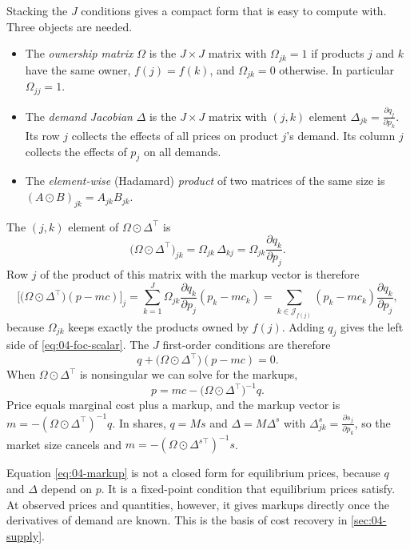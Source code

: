 Stacking the $J$ conditions gives a compact form that is easy to compute with. Three objects are needed.
\begin{itemize}
  \item The \emph{ownership matrix} $\Omega$ is the $J \times J$ matrix with $\Omega_{jk} = 1$ if products $j$ and
  $k$ have the same owner, $f(j) = f(k)$, and $\Omega_{jk} = 0$ otherwise. In particular $\Omega_{jj} = 1$.
  \item The \emph{demand Jacobian} $\Delta$ is the $J \times J$ matrix with $(j, k)$ element
  $\Delta_{jk} = \frac{\partial q_j}{\partial p_k}$. Its row $j$ collects the effects of all prices on product
  $j$'s demand. Its column $j$ collects the effects of $p_j$ on all demands.
  \item The \emph{element-wise} (Hadamard) \emph{product} of two matrices of the same size is
  $(A \odot B)_{jk} = A_{jk}B_{jk}$.
\end{itemize}
The $(j, k)$ element of $\Omega \odot \Delta^\top$ is
\begin{equation*}
\big(\Omega \odot \Delta^\top\big)_{jk} = \Omega_{jk}\,\Delta_{kj} = \Omega_{jk}\frac{\partial q_k}{\partial p_j}.
\end{equation*}
Row $j$ of the product of this matrix with the markup vector is therefore
\begin{equation*}
\Big[\big(\Omega \odot \Delta^\top\big)(p - mc)\Big]_j
= \sum_{k = 1}^{J}\Omega_{jk}\frac{\partial q_k}{\partial p_j}(p_k - mc_k)
= \sum_{k \in \mathcal{J}_{f(j)}}(p_k - mc_k)\frac{\partial q_k}{\partial p_j},
\end{equation*}
because $\Omega_{jk}$ keeps exactly the products owned by $f(j)$. Adding $q_j$ gives the left side of
\eqref{eq:04-foc-scalar}. The $J$ first-order conditions are therefore
\begin{equation}\label{eq:04-foc-matrix}
q + \big(\Omega \odot \Delta^\top\big)(p - mc) = 0.
\end{equation}
When $\Omega \odot \Delta^\top$ is nonsingular we can solve for the markups,
\begin{equation}\label{eq:04-markup}
p = mc - \big(\Omega \odot \Delta^\top\big)^{-1}q.
\end{equation}
Price equals marginal cost plus a markup, and the markup vector is $m = -(\Omega \odot \Delta^\top)^{-1}q$. In
shares, $q = Ms$ and $\Delta = M\Delta^s$ with $\Delta^s_{jk} = \frac{\partial s_j}{\partial p_k}$, so the market
size cancels and $m = -(\Omega \odot \Delta^{s\top})^{-1}s$.

Equation \eqref{eq:04-markup} is not a closed form for equilibrium prices, because $q$ and $\Delta$ depend on
$p$. It is a fixed-point condition that equilibrium prices satisfy. At observed prices and quantities, however,
it gives markups directly once the derivatives of demand are known. This is the basis of cost recovery in
\cref{sec:04-supply}.

